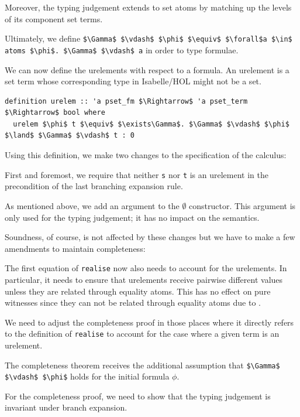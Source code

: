 \documentclass[runningheads]{llncs}
\begin{document}
Moreover, the typing judgement extends to set atoms by matching up the levels of its component set terms.

Ultimately, we define \lstinline!$\Gamma$ $\vdash$ $\phi$ $\equiv$ $\forall$a $\in$ atoms $\phi$. $\Gamma$ $\vdash$ a! in order to type formulae.

We can now define the urelements with respect to a formula.
An urelement is a set term whose corresponding type in Isabelle/HOL might not be a set.
\begin{lstlisting}
definition urelem :: 'a pset_fm $\Rightarrow$ 'a pset_term $\Rightarrow$ bool where
  urelem $\phi$ t $\equiv$ $\exists\Gamma$. $\Gamma$ $\vdash$ $\phi$ $\land$ $\Gamma$ $\vdash$ t : 0
\end{lstlisting}
Using this definition, we make two changes to the specification of the calculus: 
\begin{enumerate*}[label=(\arabic*)]
  \item First and foremost, we require that neither \lstinline!s! nor \lstinline!t! is an urelement in the precondition of the last branching expansion rule.
  \item As mentioned above, we add an argument to the $\emptyset$ constructor.
    This argument is only used for the typing judgement; it has no impact on the semantics.
\end{enumerate*}

Soundness, of course, is not affected by these changes but we have to make a few amendments to maintain completeness:
\begin{enumerate*}[label=(\arabic*)]
  \item The first equation of \lstinline!realise! now also needs to account for the urelements.
    In particular, it needs to ensure that urelements receive pairwise different values unless they are related through equality atoms. 
    This has no effect on pure witnesses since they can not be related through equality atoms due to .
  \item We need to adjust the completeness proof in those places where it directly refers to the definition of \lstinline!realise! to account for the case where a given term is an urelement.
  \item The completeness theorem receives the additional assumption that \lstinline!$\Gamma$ $\vdash$ $\phi$! holds for the initial formula $\phi$. 
  \item For the completeness proof, we need to show that the typing judgement is invariant under branch expansion.
\end{enumerate*}
\end{document}
